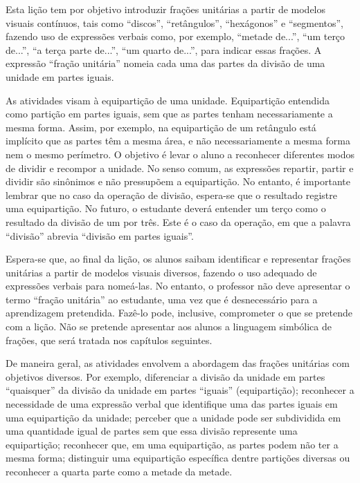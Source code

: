 


\noindent {\color{special}{\Large \bf LIÇÃO 1 - Para o professor}}
\vspace{.5cm}

Esta lição tem por objetivo introduzir frações unitárias a partir de modelos visuais contínuos, tais como ``discos'', ``retângulos'', ``hexágonos'' e ``segmentos'', fazendo uso de expressões verbais como, por exemplo, ``metade de...'', ``um terço de...'', ``a terça parte de...'', ``um quarto de...'', para indicar essas frações. 
A expressão ``fração unitária'' nomeia cada uma das partes da divisão de uma unidade em partes iguais.

As atividades visam à equipartição de uma unidade. Equipartição entendida como partição em partes iguais, sem que as partes tenham necessariamente a mesma forma. Assim, por exemplo, na equipartição de um retângulo está implícito que as partes têm a mesma área, e não necessariamente a mesma forma nem o mesmo perímetro. O objetivo é levar o aluno a reconhecer diferentes modos de dividir e recompor a unidade. No senso comum, as expressões repartir, partir e dividir são sinônimos e não pressupõem a equipartição. No entanto, é importante lembrar que no caso da operação de divisão, espera-se que o resultado registre uma equipartição. No futuro, o estudante deverá entender um terço como o resultado da divisão de um por três. Este é o caso da operação, em que a palavra ``divisão'' abrevia ``divisão em partes iguais''.

Espera-se que, ao final da lição, os alunos saibam identificar e representar frações unitárias a partir de modelos visuais diversos, fazendo o uso adequado de expressões verbais para nomeá-las. No entanto, o professor não deve apresentar o termo ``fração unitária'' ao estudante, uma vez que é desnecessário para a aprendizagem pretendida. Fazê-lo pode, inclusive, comprometer o que se pretende com a lição. Não se pretende apresentar aos alunos a linguagem simbólica de frações, que será tratada nos capítulos seguintes.

De maneira geral, as atividades envolvem a abordagem das frações unitárias com objetivos diversos. Por exemplo, diferenciar a divisão da unidade em partes ``quaisquer'' da divisão da unidade em partes ``iguais'' (equipartição); reconhecer a necessidade de uma expressão verbal que identifique uma das partes iguais em uma equipartição da unidade; perceber que a unidade pode ser subdividida em uma quantidade igual de partes sem que essa divisão represente uma equipartição; reconhecer que, em uma equipartição, as partes podem não ter a mesma forma; distinguir uma equipartição específica dentre partições diversas ou reconhecer a quarta parte como a metade da metade.

